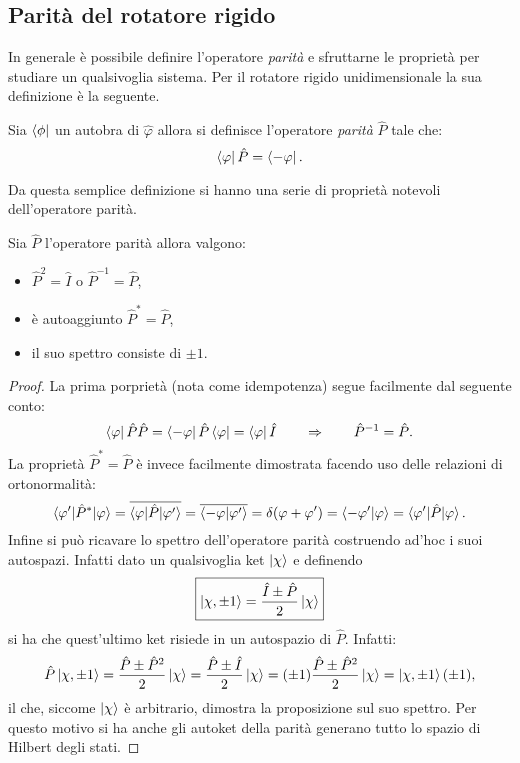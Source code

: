\subsection{Parità del rotatore rigido}
In generale è possibile definire l'operatore \emph{parità} e sfruttarne le proprietà per studiare un qualsivoglia sistema. Per il rotatore rigido unidimensionale la sua definizione è la seguente.
\begin{definition}
    Sia $\bra{\phi}$ un autobra di $\hat\varphi$ allora si definisce l'operatore \emph{parità} $\hat P$ tale che:
    \begin{equation*}
       \bra{\varphi}\hat P=\bra{-\varphi}.
    \end{equation*}    
\end{definition}
Da questa semplice definizione si hanno una serie di proprietà notevoli dell'operatore parità.
\begin{proposition}
    Sia $\hat P$ l'operatore parità allora valgono:
    \begin{itemize}
        \item $\hat P^2=\hat I$  o $\hat P^{-1}=\hat P$,
        \item è autoaggiunto $\hat P^*=\hat P$,
        \item il suo spettro consiste di $\pm1$.
    \end{itemize}
\end{proposition}
\begin{proof}
    La prima porprietà (nota come idempotenza) segue facilmente dal seguente conto:
    \begin{equation*}
        \bra{\varphi}\hat P\hat P=\bra{-\varphi}\hat P\bra{\varphi}=\bra{\varphi}\hat I\qquad \Rightarrow\qquad \hat P^{-1}=\hat P.
    \end{equation*}
    La proprietà $\hat P^*=\hat P$ è invece facilmente dimostrata facendo uso delle relazioni di ortonormalità:
    \begin{equation*}
        \braket{\varphi'|\hat P^*|\varphi}=\overline{\braket{\varphi|\hat P|\varphi'}}=\overline{\braket{-\varphi|\varphi'}}=\delta(\varphi+\varphi')=\braket{-\varphi'|\varphi}=\braket{\varphi'|\hat P|\varphi}.
    \end{equation*}
    Infine si può ricavare lo spettro dell'operatore parità costruendo ad'hoc i suoi autospazi. Infatti dato un qualsivoglia ket $\ket{\chi}$ e definendo
    \begin{equation}
        \boxed{\ket{\chi,\pm1}=\frac{\hat I\pm\hat P}{2}\ket{\chi}} \label{autoketParità}
    \end{equation}
     si ha che quest'ultimo ket risiede in un autospazio di $\hat P$. Infatti:
     \begin{equation*}
        \hat P\ket{\chi,\pm1}=\frac{\hat P\pm\hat P^2}{2}\ket{\chi}=\frac{\hat P\pm\hat I}{2}\ket{\chi}=(\pm1)\frac{\hat P\pm\hat P^2}{2}\ket{\chi}=\ket{\chi,\pm1}(\pm1),
     \end{equation*}
     il che, siccome $\ket{\chi}$ è arbitrario, dimostra la proposizione sul suo spettro. Per questo motivo si ha anche gli autoket della parità generano tutto lo spazio di Hilbert degli stati.
\end{proof}
